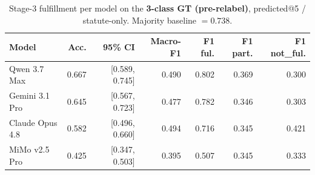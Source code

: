 \begin{table}[htbp]
  \centering
  \caption{Stage-3 fulfillment per model on the \textbf{3-class GT (pre-relabel)}, predicted@5 / statute-only. Majority baseline $=0.738$.}
  \label{tab:fulfillment-models-ternary}
  \begin{tabular}{lrrrrrr}
    \toprule
    Model & Acc. & 95\% CI & Macro-F1 & F1 ful. & F1 part. & F1 not\_ful. \\
    \midrule
    Qwen 3.7 Max & 0.667 & [0.589, 0.745] & 0.490 & 0.802 & 0.369 & 0.300 \\
    Gemini 3.1 Pro & 0.645 & [0.567, 0.723] & 0.477 & 0.782 & 0.346 & 0.303 \\
    Claude Opus 4.8 & 0.582 & [0.496, 0.660] & 0.494 & 0.716 & 0.345 & 0.421 \\
    MiMo v2.5 Pro & 0.425 & [0.347, 0.503] & 0.395 & 0.507 & 0.345 & 0.333 \\
    \bottomrule
  \end{tabular}
\end{table}

